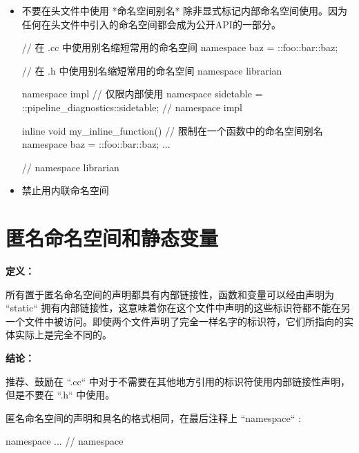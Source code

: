 \begin{itemize}
  \item  不要在头文件中使用 *命名空间别名* 除非显式标记内部命名空间使用。因为任何在头文件中引入的命名空间都会成为公开API的一部分。

\begin{cppcode}
  // 在 .cc 中使用别名缩短常用的命名空间
  namespace baz = ::foo::bar::baz;
\end{cppcode}

\begin{cppcode}
// 在 .h 中使用别名缩短常用的命名空间
namespace librarian {
  namespace impl {  // 仅限内部使用
      namespace sidetable = ::pipeline_diagnostics::sidetable;
    }  // namespace impl

  inline void my_inline_function() {
    // 限制在一个函数中的命名空间别名
    namespace baz = ::foo::bar::baz;
    ...
  }
}  // namespace librarian
\end{cppcode}

  \item  禁止用内联命名空间
\end{itemize}

\section{匿名命名空间和静态变量} \label{unnamed-namespace-and-static-variables}


\textbf{定义：}

所有置于匿名命名空间的声明都具有内部链接性，函数和变量可以经由声明为 ``static`` 拥有内部链接性，这意味着你在这个文件中声明的这些标识符都不能在另一个文件中被访问。即使两个文件声明了完全一样名字的标识符，它们所指向的实体实际上是完全不同的。

\textbf{结论：}

推荐、鼓励在 ``.cc`` 中对于不需要在其他地方引用的标识符使用内部链接性声明，但是不要在 ``.h`` 中使用。

匿名命名空间的声明和具名的格式相同，在最后注释上 ``namespace`` :

\begin{cppcode}
      namespace {
      ...
      }  // namespace
\end{cppcode}
